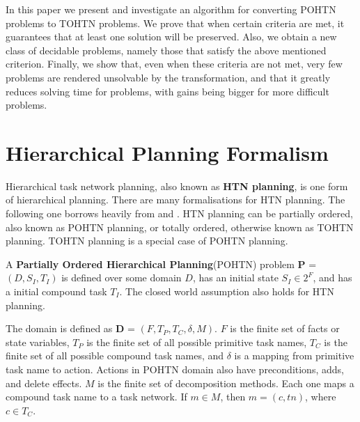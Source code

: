 \documentclass[letterpaper]{article}
\begin{document}

In this paper we present and investigate an algorithm for converting POHTN problems to TOHTN problems. We prove that when certain criteria are met, it guarantees that at least one solution will be preserved. 
Also, we obtain a new class of decidable problems, namely those that satisfy the above mentioned criterion. Finally, we show that, even when these criteria are not met, very few problems are rendered unsolvable by the transformation, and that it greatly reduces solving time for problems, with gains being bigger for more difficult problems. 


\section{Hierarchical Planning Formalism}
Hierarchical task network planning, also known as \textbf{HTN planning}, is one form of hierarchical planning. There are many formalisations for HTN planning. The following one borrows heavily from \cite{HTNSurvey} and \cite{Geier2011TIHTNDecidability}. HTN planning can be partially ordered, also known as POHTN planning, or totally ordered, otherwise known as TOHTN planning. TOHTN planning is a special case of POHTN planning.  %

A \textbf{Partially Ordered Hierarchical Planning}(POHTN) problem \textbf{P} = $(D, S_I, T_I)$
is defined over some domain $D$, 
has an initial state $S_I \in 2^F$, and 
has a initial compound task $T_I$. 
The closed world assumption also holds for HTN planning.

The domain is defined as \textbf{D} = $(F, T_P, T_C, \delta, M)$.
$F$ is the finite set of facts or state variables, $T_P$ is the finite set of all possible primitive task names, $T_C$ is the finite set of all possible compound task names, and
$\delta$ is a mapping from primitive task name to action. Actions in POHTN domain also have preconditions, adds, and delete effects.
$M$ is the finite set of decomposition methods. Each one maps a compound task name to a task network. If $m \in M$, then $m=(c, tn)$, where $c \in T_C$.
\end{document}
